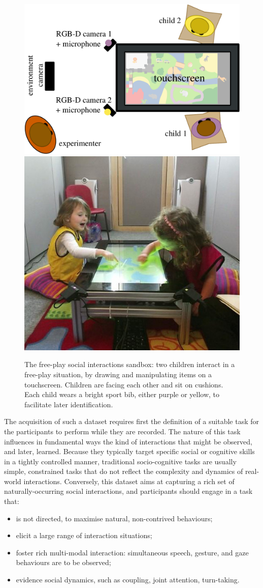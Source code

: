 \documentclass{article}
\begin{document}
\begin{figure}
    \centering
    \includegraphics[width=0.55\linewidth]{setup_child_child_top}
    \hspace{1em}
    \includegraphics[width=0.4\linewidth]{child-child-env}
    \caption{The free-play social interactions sandbox: two children interact in
    a free-play situation, by drawing and manipulating items on a touchscreen.
    Children are facing each other and sit on cushions. Each child wears a
    bright sport bib, either purple or yellow, to facilitate later
    identification.}

    \label{fig|freeplay}
\end{figure}

The acquisition of such a dataset requires first the definition of a suitable
task for the participants to perform while they are recorded. The nature of
this task influences in fundamental ways the kind of interactions that might be
observed, and later, learned. Because they typically target specific social
or cognitive skills in a tightly controlled manner, traditional socio-cognitive tasks are
usually simple, constrained tasks that do not reflect the complexity and dynamics of
real-world interactions. Conversely, this dataset aims at capturing a rich set
of naturally-occurring social interactions, and participants should engage in a task that:

\begin{itemize}
    \item is not directed, to maximise natural, non-contrived behaviours;
    \item elicit a large range of interaction situations;
    \item foster rich multi-modal interaction: simultaneous speech, gesture, and gaze
        behaviours are to be observed;
    \item evidence social dynamics, such as coupling, joint attention, turn-taking.
\end{itemize}
\end{document}
